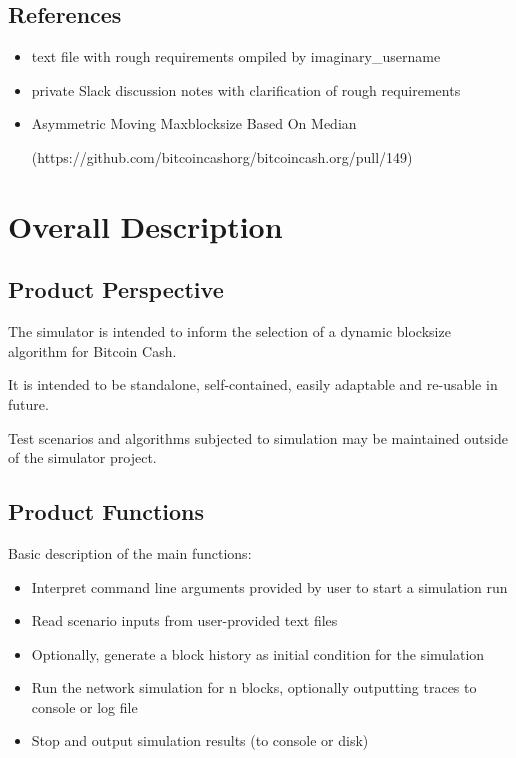 \documentclass{scrreprt}
\begin{document}
\section{References}
\begin{itemize}
   \item text file with rough requirements ompiled by imaginary_username
   \item private Slack discussion notes with clarification of rough requirements
   \item Asymmetric Moving Maxblocksize Based On Median

      (https://github.com/bitcoincashorg/bitcoincash.org/pull/149)
\end{itemize}

\chapter{Overall Description}


\section{Product Perspective}
The simulator is intended to inform the selection of a dynamic blocksize algorithm
for Bitcoin Cash.

It is intended to be standalone, self-contained, easily adaptable and
re-usable in future.

Test scenarios and algorithms subjected to simulation may be maintained
outside of the simulator project.


\section{Product Functions}

Basic description of the main functions:
\begin{itemize}
   \item Interpret command line arguments provided by user to start a simulation run
   \item Read scenario inputs from user-provided text files
   \item Optionally, generate a block history as initial condition for the simulation
   \item Run the network simulation for n blocks, optionally outputting traces to console or log file
   \item Stop and output simulation results (to console or disk)
\end{itemize}
\end{document}
